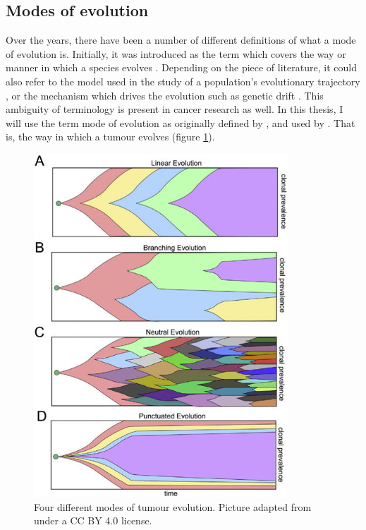 \subsection{Modes of evolution}
Over the years, there have been a number of different definitions of what a mode
of evolution is. Initially, it was introduced as the term which covers the way
or manner in which a species evolves \cite{eiseley_tempo_1945}. Depending on the
piece of literature, it could also refer to the model used in the study of a
population's evolutionary trajectory \cite{yotoko_does_2011}, or the mechanism
which drives the evolution such as genetic drift \cite{glassman_cancer_1996,
wolf_genome_2013}. This ambiguity of terminology is present in cancer research
as well. In this thesis, I will use the term mode of evolution as originally
defined by \cite{eiseley_tempo_1945}, and used by \cite{davis_tumor_2017,
noble_spatial_2022}. That is, the way in which a tumour evolves (figure
\ref{fig:modes}).

\begin{figure}[h!]
    \centering
    \includegraphics[width=0.85\textwidth]{Chapter_3/figures/modes.jpeg}
    \caption{Four different modes of tumour evolution. Picture adapted from
    \cite{davis_tumor_2017} under a CC BY 4.0 license.}
    \label{fig:modes}
\end{figure}

